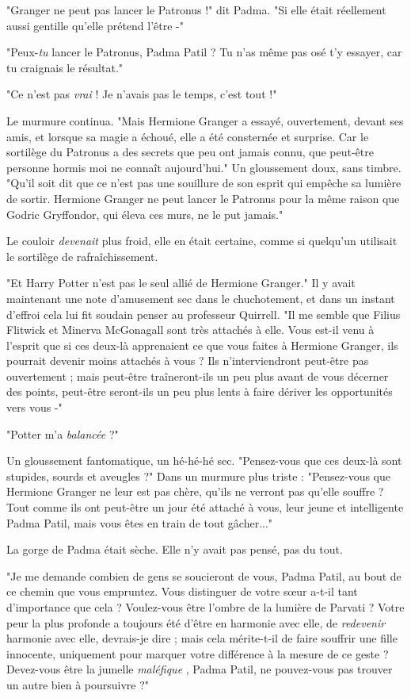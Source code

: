 "Granger ne peut pas lancer le Patronus !" dit Padma. "Si elle était réellement aussi gentille qu'elle prétend l'être -"

"Peux-\emph{tu}  lancer le Patronus, Padma Patil ? Tu n'as même pas osé t'y essayer, car tu craignais le résultat."

"Ce n'est pas \emph{vrai}  ! Je n'avais pas le temps, c'est tout !"

Le murmure continua. "Mais Hermione Granger a essayé, ouvertement, devant ses amis, et lorsque sa magie a échoué, elle a été consternée et surprise. Car le sortilège du Patronus a des secrets que peu ont jamais connu, que peut-être personne hormis moi ne connaît aujourd'hui." Un gloussement doux, sans timbre. "Qu'il soit dit que ce n'est pas une souillure de son esprit qui empêche sa lumière de sortir. Hermione Granger ne peut lancer le Patronus pour la même raison que Godric Gryffondor, qui éleva ces murs, ne le put jamais."

Le couloir \emph{devenait}  plus froid, elle en était certaine, comme si quelqu'un utilisait le sortilège de rafraîchissement.

"Et Harry Potter n'est pas le seul allié de Hermione Granger." Il y avait maintenant une note d'amusement sec dans le chuchotement, et dans un instant d'effroi cela lui fit soudain penser au professeur Quirrell. "Il me semble que Filius Flitwick et Minerva McGonagall sont très attachés à elle. Vous est-il venu à l'esprit que si ces deux-là apprenaient ce que vous faites à Hermione Granger, ils pourrait devenir moins attachés à vous ? Ils n'interviendront peut-être pas ouvertement ; mais peut-être traîneront-ils un peu plus avant de vous décerner des points, peut-être seront-ils un peu plus lents à faire dériver les opportunités vers vous -"

"Potter m'a \emph{balancée}  ?"

Un gloussement fantomatique, un hé-hé-hé sec. "Pensez-vous que ces deux-là sont stupides, sourds et aveugles ?" Dans un murmure plus triste : "Pensez-vous que Hermione Granger ne leur est pas chère, qu'ils ne verront pas qu'elle souffre ? Tout comme ils ont peut-être un jour été attaché à vous, leur jeune et intelligente Padma Patil, mais vous êtes en train de tout gâcher..."

La gorge de Padma était sèche. Elle n'y avait pas pensé, pas du tout.

"Je me demande combien de gens se soucieront de vous, Padma Patil, au bout de ce chemin que vous empruntez. Vous distinguer de votre sœur a-t-il tant d'importance que cela ? Voulez-vous être l'ombre de la lumière de Parvati ? Votre peur la plus profonde a toujours été d'être en harmonie avec elle, de \emph{redevenir}  harmonie avec elle, devrais-je dire ; mais cela mérite-t-il de faire souffrir une fille innocente, uniquement pour marquer votre différence à la mesure de ce geste ? Devez-vous être la jumelle \emph{maléfique} , Padma Patil, ne pouvez-vous pas trouver un autre bien à poursuivre ?"

